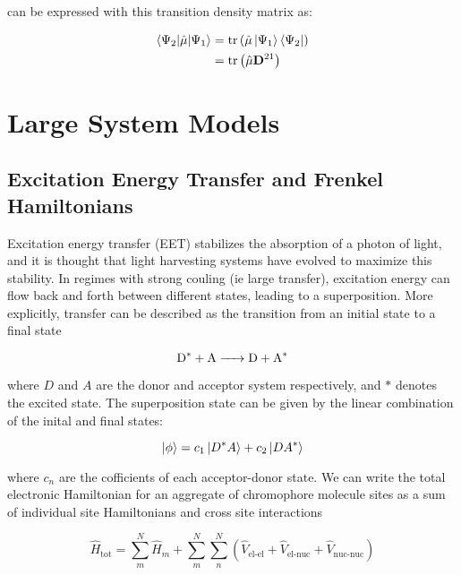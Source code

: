 can be expressed with this transition density matrix as:

\begin{equation}
\begin{split}    
\braket{\Psi_2|\hat{\mathbf{\mu}}|\Psi_1} &= \text{tr}\left(\hat{\mathbf{\mu}} \ket{\Psi_1} \bra{\Psi_2} \right) \\
&= \text{tr}\left( \hat{\mathbf{\mu}} \mathbf{D}^{21}\right)
\end{split}
\end{equation}

\section{Large System Models}
\label{sec:large_systems_theory}

\subsection{Excitation Energy Transfer and Frenkel Hamiltonians}
\label{subsec:frenkel_exciton_theory}

Excitation energy transfer (EET) stabilizes the absorption of a photon of light,
and it is thought that light harvesting systems have evolved to maximize this stability\cite{Cleary2013}.
In regimes with strong couling (ie large transfer), excitation energy can flow back
and forth between different states, leading to a superposition. More explicitly,
transfer can be described as the transition from an initial state to a final state

\begin{equation}
\ce{D^* + A -> D + A^*}
\end{equation}

where $D$ and $A$ are the donor and acceptor system respectively, and $*$ denotes
the excited state. The superposition state can be given by the linear combination 
of the inital and final states:

\begin{equation}
\ket{\phi} = c_1 \ket{D^*A} + c_2 \ket{DA^*}
\end{equation}

where $c_n$ are the cofficients of each acceptor-donor state. We can write the total
electronic Hamiltonian for an aggregate of chromophore molecule sites as a sum of
individual site Hamiltonians and cross site interactions

\begin{equation}
\hat{H}_{\text{tot}} = \sum^N_m \hat{H}_m + \sum^N_m \sum^N_n \left(\hat{V}_{\text{el-el}} + \hat{V}_{\text{el-nuc}} + \hat{V}_{\text{nuc-nuc}}\right)
\end{equation}


